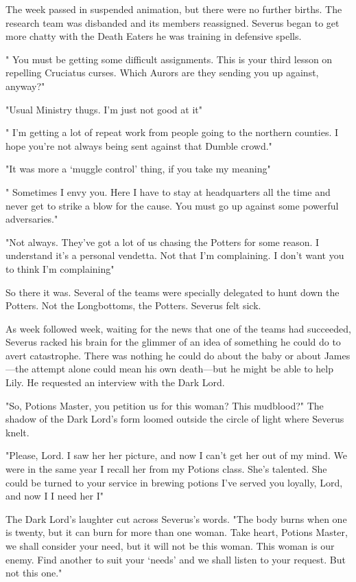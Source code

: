 The week passed in suspended animation, but there were no further births. The research team was disbanded and its members reassigned. Severus began to get more chatty with the Death Eaters he was training in defensive spells.

"{\el} You must be getting some difficult assignments. This is your third lesson on repelling Cruciatus curses. Which Aurors are they sending you up against, anyway?"

"Usual Ministry thugs. I'm just not good at it{\el}"

"{\el} I'm getting a lot of repeat work from people going to the northern counties. I hope you're not always being sent against that Dumble crowd."

"It was more a `muggle control' thing, if you take my meaning{\el}"

"{\el} Sometimes I envy you. Here I have to stay at headquarters all the time and never get to strike a blow for the cause. You must go up against some powerful adversaries."

"Not always. They've got a lot of us chasing the Potters for some reason. I understand it's a personal vendetta. Not that I'm complaining. I don't want you to think I'm complaining{\el}"

So there it was. Several of the teams were specially delegated to hunt down the Potters. Not the Longbottoms, the Potters. Severus felt sick.

As week followed week, waiting for the news that one of the teams had succeeded, Severus racked his brain for the glimmer of an idea of something he could do to avert catastrophe. There was nothing he could do about the baby or about James—the attempt alone could mean his own death—but he might be able to help Lily. He requested an interview with the Dark Lord.

"So, Potions Master, you petition us for this woman? This mudblood?" The shadow of the Dark Lord's form loomed outside the circle of light where Severus knelt.

"Please, Lord. I saw her{\el} her picture, and now I can't get her out of my mind. We were in the same year{\el} I recall her from my Potions class. She's talented. She could be turned to your service{\el} in brewing potions{\el} I've served you loyally, Lord, and now I{\el} I need her{\el} I{\el}"

The Dark Lord's laughter cut across Severus's words. "The body burns when one is twenty, but it can burn for more than one woman. Take heart, Potions Master, we shall consider your need, but it will not be this woman. This woman is our enemy. Find another to suit your `needs' and we shall listen to your request. But not this one."

